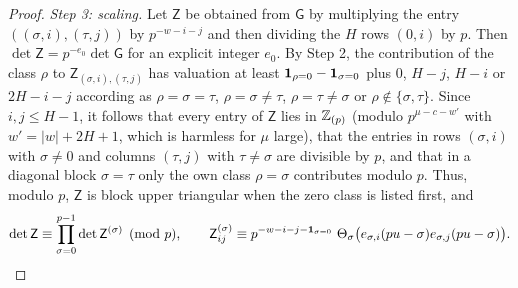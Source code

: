 \begin{proof}
\emph{Step 3: scaling.} Let $\mathsf Z$ be obtained from $\mathsf G$ by multiplying the entry $((\sigma,i),(\tau,j))$ by $p^{-w-i-j}$ and then dividing the $H$ rows $(0,i)$ by $p$. Then $\det\mathsf Z=p^{-e_0}\det\mathsf G$ for an explicit integer $e_0$. By Step 2, the contribution of the class $\rho$ to $\mathsf Z_{(\sigma,i),(\tau,j)}$ has valuation at least $\mathbf{1}_{\rho=0}-\mathbf{1}_{\sigma=0}$ plus $0$, $H-j$, $H-i$ or $2H-i-j$ according as $\rho=\sigma=\tau$, $\rho=\sigma\ne\tau$, $\rho=\tau\ne\sigma$ or $\rho\notin\{\sigma,\tau\}$. Since $i,j\le H-1$, it follows that every entry of $\mathsf Z$ lies in $\mathbb{Z}_{(p)}$ (modulo $p^{\mu-c-w'}$ with $w'=|w|+2H+1$, which is harmless for $\mu$ large), that the entries in rows $(\sigma,i)$ with $\sigma\ne0$ and columns $(\tau,j)$ with $\tau\ne\sigma$ are divisible by $p$, and that in a diagonal block $\sigma=\tau$ only the own class $\rho=\sigma$ contributes modulo $p$. Thus, modulo $p$, $\mathsf Z$ is block upper triangular when the zero class is listed first, and
\[
\det\mathsf Z\equiv\prod_{\sigma=0}^{p-1}\det\mathsf Z^{(\sigma)}\pmod p,\qquad \mathsf Z^{(\sigma)}_{ij}\equiv p^{-w-i-j-\ind_{\sigma=0}}\ \Theta_\sigma\bigl(e_{\sigma,i}(pu-\sigma)e_{\sigma,j}(pu-\sigma)\bigr).
\]


\end{proof}
